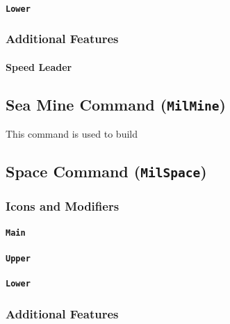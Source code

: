 \documentclass[a4paper, titlepage]{article}
\begin{document}
\paragraph{\texttt{Lower}}
%

\subsubsection{Additional Features}

\paragraph{Speed Leader}

\subsection{Sea Mine Command (\textbf{\texttt{MilMine}})}

This command is used to build 

\subsection{Space Command (\textbf{\texttt{MilSpace}})}

\subsubsection{Icons and Modifiers}

\paragraph{\texttt{Main}}
%

\paragraph{\texttt{Upper}}
%

\paragraph{\texttt{Lower}}
%

\subsubsection{Additional Features}
\end{document}
